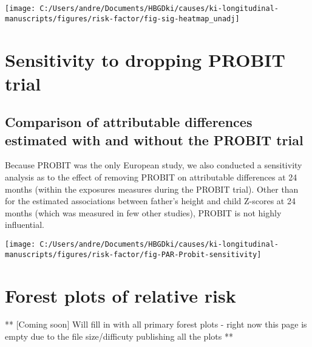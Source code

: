 \documentclass[9pt,]{book}
\begin{document}
\texttt{[image: C:/Users/andre/Documents/HBGDki/causes/ki-longitudinal-manuscripts/figures/risk-factor/fig-sig-heatmap\_unadj]}

\chapter{Sensitivity to dropping PROBIT trial}\label{no-PROBIT}

\raggedright

\section{Comparison of attributable differences estimated with and
without the PROBIT
trial}\label{comparison-of-attributable-differences-estimated-with-and-without-the-probit-trial}

Because PROBIT was the only European study, we also conducted a
sensitivity analysis as to the effect of removing PROBIT on attributable
differences at 24 months (within the exposures measures during the
PROBIT trial). Other than for the estimated associations between
father's height and child Z-scores at 24 months (which was measured in
few other studies), PROBIT is not highly influential.

\texttt{[image: C:/Users/andre/Documents/HBGDki/causes/ki-longitudinal-manuscripts/figures/risk-factor/fig-PAR-Probit-sensitivity]}

\chapter{Forest plots of relative risk}\label{RR-forest}

\raggedright

** {[}Coming soon{]} Will fill in with all primary forest plots - right
now this page is empty due to the file size/difficuty publishing all the
plots **


\end{document}
